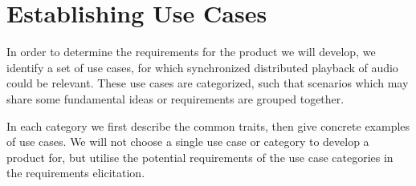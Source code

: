 \chapter{Establishing Use Cases}
\label{cha:establishing_use_cases}
In order to determine the requirements for the product we will develop, we identify a set of use cases, for which synchronized distributed playback of audio could be relevant.
These use cases are categorized, such that scenarios which may share some fundamental ideas or requirements are grouped together.

In each category we first describe the common traits, then give concrete examples of use cases.
We will not choose a single use case or category to develop a product for, but utilise the potential requirements of the use case categories in the requirements elicitation.


